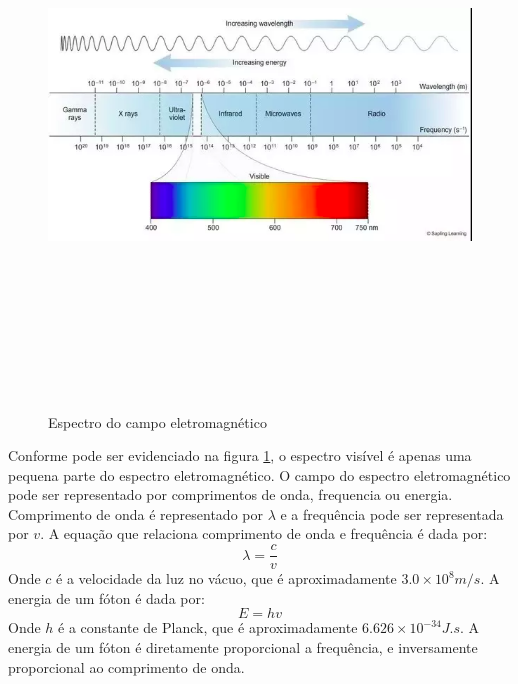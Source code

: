 \documentclass[12pt]{article}
\begin{document}
    \begin{figure}[H]
        \centering
        \includegraphics[width=15cm,height=15cm]{images/14.png}
        \caption{Espectro do campo eletromagnético}
        \label{fig:espectro}
    \end{figure}

    Conforme pode ser evidenciado na figura \ref{fig:espectro}, o espectro visível é apenas uma pequena
    parte do espectro eletromagnético. O campo do espectro eletromagnético pode ser representado por
    comprimentos de onda, frequencia ou energia. Comprimento de onda é representado por $\lambda$ e
    a frequência pode ser representada por $v$. A equação que relaciona comprimento de onda e frequência
    é dada por:
    \begin{equation}
        \lambda = \frac{c}{v}
    \end{equation}
    Onde $c$ é a velocidade da luz no vácuo, que é aproximadamente $3.0 \times 10^{8} m/s$. A energia
    de um fóton é dada por:
    \begin{equation}
        E = hv
        \label{eq:energia}
    \end{equation}
    Onde $h$ é a constante de Planck, que é aproximadamente $6.626 \times 10^{-34} J.s$. A energia de
    um fóton é diretamente proporcional a frequência, e inversamente proporcional ao comprimento de onda.
\end{document}
